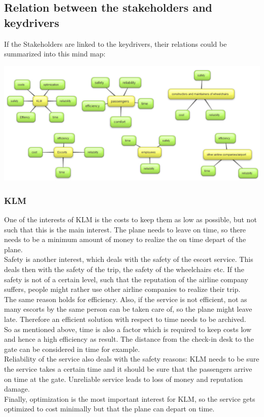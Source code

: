 \documentclass[a4paper, 11pt, notitlepage]{report}
\begin{document}
\subsection{Relation between the stakeholders and keydrivers}
If the Stakeholders are linked to the keydrivers, their relations could be summarized into this mind map:
\begin{center}
\includegraphics[scale=0.4]{figures/relationstakeholders.jpg}
\end{center}
\subsubsection{KLM}
One of the interests of KLM is the costs to keep them as low as possible, but not such that this is the main interest. The plane needs to leave on time, so there needs to be a minimum amount of money to realize the on time depart of the plane.\\
Safety is another interest, which deals with the safety of the escort service. This deals then with the safety of the trip, the safety of the wheelchairs etc. If the safety is not of a certain level, such that the reputation of the airline company suffers, people might rather use other airline companies to realize their trip.\\
The same reason holds for efficiency. Also, if the service is not efficient, not as many escorts by the same person can be taken care of, so the plane might leave late. Therefore an efficient solution with respect to time needs to be archived.\\
So as mentioned above, time is also a factor which is required to keep costs low and hence a high efficiency as result. The distance from the check-in desk to the gate can be considered in time for example.\\
Reliability of the service also deals with the safety reasons: KLM needs to be sure the service takes a certain time and it should be sure that the passengers arrive on time at the gate. Unreliable service leads to loss of money and reputation damage.\\
Finally, optimization is the most important interest for KLM, so the service gets optimized to cost minimally but that the plane can depart on time.
\end{document}
